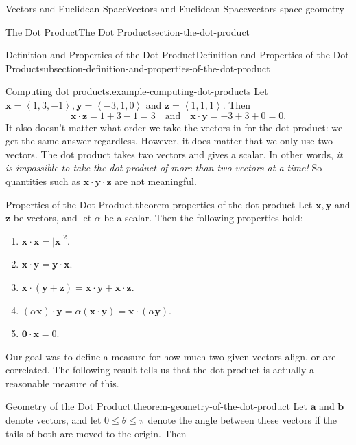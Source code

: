 \documentclass[oneside,10pt,]{book}
\numberwithin{equation}{section}
\newcommand{\vv}[1]{\mathbf{#1}}
\newcommand{\dotprod}[1]{\left\langle #1 \right\rangle}
\begin{document}
\begin{chapterptx}{Vectors and Euclidean Space}{}{Vectors and Euclidean Space}{}{}{vectors-space-geometry}
\begin{sectionptx}{The Dot Product}{}{The Dot Product}{}{}{section-the-dot-product}
\begin{subsectionptx}{Definition and Properties of the Dot Product}{}{Definition and Properties of the Dot Product}{}{}{subsection-definition-and-properties-of-the-dot-product}
\begin{example}{Computing dot products.}{example-computing-dot-products}
\hypertarget{p-1131}{}%
Let \(\vv{x} = \dotprod{1,3,-1},\vv{y} = \dotprod{-3,1,0}\) and \(\vv{z} = \dotprod{1,1,1}\). Then%
%
\begin{equation*}
\vv{x}\cdot\vv{z} = 1+3-1 = 3\quad\text{and}\quad\vv{x}\cdot\vv{y} = -3+3+0 = 0.
\end{equation*}
\hypertarget{p-1132}{}%
It also doesn't matter what order we take the vectors in for the dot product: we get the same answer regardless. However, it does matter that we only use two vectors. The dot product takes two vectors and gives a scalar. In other words, \emph{it is impossible to take the dot product of more than two vectors at a time!} So quantities such as \(\vv{x}\cdot\vv{y}\cdot\vv{z}\) are not meaningful.%
\end{example}
\begin{theorem}{Properties of the Dot Product.}{}{theorem-properties-of-the-dot-product}%
\hypertarget{p-1133}{}%
Let \(\vv{x},\vv{y}\) and \(\vv{z}\) be vectors, and let \(\alpha\) be a scalar. Then the following properties hold:%
\leavevmode%
\begin{multicols}{2}
\begin{enumerate}
\item\hypertarget{li-118}{}\hypertarget{p-1134}{}%
\(\vv{x}\cdot\vv{x} = |\vv{x}|^{2}.\)%
\item\hypertarget{li-119}{}\hypertarget{p-1135}{}%
\(\vv{x}\cdot\vv{y} = \vv{y}\cdot\vv{x}.\)%
\item\hypertarget{li-120}{}\hypertarget{p-1136}{}%
\(\vv{x}\cdot(\vv{y}+\vv{z}) = \vv{x}\cdot\vv{y}+\vv{x}\cdot\vv{z}.\)%
\item\hypertarget{li-121}{}\hypertarget{p-1137}{}%
\((\alpha\vv{x})\cdot\vv{y} = \alpha(\vv{x}\cdot\vv{y}) = \vv{x}\cdot(\alpha\vv{y}).\)%
\item\hypertarget{li-122}{}\hypertarget{p-1138}{}%
\(\vv{0}\cdot\vv{x} = 0.\)%
\end{enumerate}
\end{multicols}
\end{theorem}
\hypertarget{p-1139}{}%
Our goal was to define a measure for how much two given vectors align, or are correlated. The following result tells us that the dot product is actually a reasonable measure of this.%
\begin{theorem}{Geometry of the Dot Product.}{}{theorem-geometry-of-the-dot-product}%
\hypertarget{p-1140}{}%
Let \(\vv{a}\) and \(\vv{b}\) denote vectors, and let \(0\leq\theta\leq\pi\) denote the angle between these vectors if the tails of both are moved to the origin. Then%

\end{theorem}
\end{subsectionptx}
\end{sectionptx}
\end{chapterptx}
\end{document}

